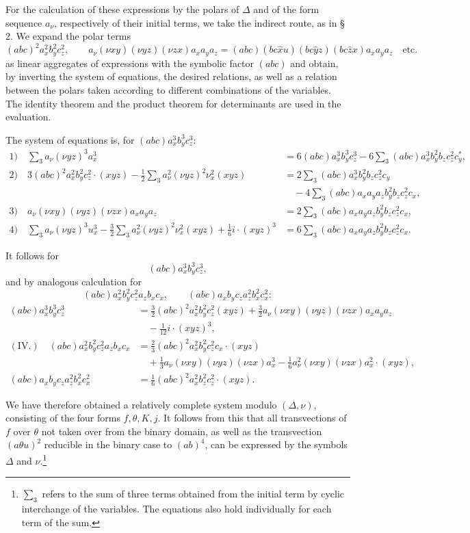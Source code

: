 \documentclass[11pt]{article}
\newcommand{\A}{\Delta}
\begin{document}
For the calculation of these expressions by the polars of $\A$ and of the form sequence $a_\nu$, respectively of their initial terms, we take the indirect route, as in § 2. We expand the polar terms
\[
(abc)^2a_x^2b_y^2c_z^2,\qquad
a_\nu(\nu xy)(\nu yz)(\nu zx)a_xa_ya_z
=(abc)(bc\widehat{x}u)(bc\widehat{y}z)(bc\widehat{z}x)a_xa_ya_z\quad\text{etc.}
\]
as linear aggregates of expressions with the symbolic factor $(abc)$ and obtain, by inverting the system of equations, the desired relations, as well as a relation between the polars taken according to different combinations of the variables. The identity theorem and the product theorem for determinants are used in the evaluation.

The system of equations is, for $(abc)a_x^3b_y^3c_z^3$:
\begingroup\small
\[
\begin{aligned}
1)\quad
\sum_3 a_\nu(\nu yz)^3a_x^3
&=6(abc)a_x^3b_y^3c_z^3
-6\sum_3(abc)a_x^3b_y^2b_zc_z^2c_y^{*},\\[0.4em]
2)\quad
3(abc)^2a_x^2b_y^2c_z^2\cdot(xyz)
-\frac12\sum_3 a_\nu^2(\nu yz)^2\nu_x^2(xyz)
&=2\sum_3(abc)a_x^3b_y^2b_zc_z^2c_y\\
&\quad-4\sum_3(abc)a_xa_ya_zb_y^2b_zc_z^2c_x,\\[0.4em]
3)\quad
a_\nu(\nu xy)(\nu yz)(\nu zx)a_xa_ya_z
&=2\sum_3(abc)a_xa_ya_zb_y^2b_zc_z^2c_x,\\[0.4em]
4)\quad
\sum_3 a_\nu(\nu yz)^3u_x^3
-\frac32\sum_3 a_\nu^2(\nu yz)^2\nu_x^2(xyz)
+\frac16 i\cdot(xyz)^3
&=6\sum_3(abc)a_xa_ya_zb_y^2b_zc_z^2c_x.
\end{aligned}
\]
\endgroup

It follows for
\[
(abc)a_x^3b_y^3c_z^3,
\]
and by analogous calculation for
\[
(abc)a_x^2b_y^2c_z^2a_zb_xc_x,\qquad
(abc)a_xb_yc_za_z^2b_x^2c_x^2:
\]
\[
\begin{aligned}
(abc)a_x^3b_y^3c_z^3
&=\frac32(abc)^2a_x^2b_y^2c_z^2(xyz)
+\frac32 a_\nu(\nu xy)(\nu yz)(\nu zx)a_xa_ya_z\\
&\quad-\frac1{12}i\cdot(xyz)^3,\\[0.4em]
(\text{IV.})\quad
(abc)a_x^2b_y^2c_z^2a_zb_xc_x
&=\frac23(abc)^2a_x^2b_y^2c_z^2c_x\cdot(xyz)\\
&\quad+\frac13a_\nu(\nu xy)(\nu yz)(\nu zx)a_x^3
-\frac16 a_\nu^2(\nu xy)(\nu zx)a_x^2\cdot(xyz),\\[0.4em]
(abc)a_xb_yc_za_z^2b_x^2c_x^2
&=\frac16(abc)^2a_x^2b_z^2c_z^2\cdot(xyz).
\end{aligned}
\]

We have therefore obtained a relatively complete system modulo $(\A,\nu)$, consisting of the four forms $f,\theta,K,j$. It follows from this that all transvections of $f$ over $\theta$ not taken over from the binary domain, as well as the transvection $(a\theta u)^2$ reducible in the binary case to $(ab)^4$, can be expressed by the symbols $\A$ and $\nu$.\footnote{$\sum_3$ refers to the sum of three terms obtained from the initial term by cyclic interchange of the variables. The equations also hold individually for each term of the sum.}
\end{document}
